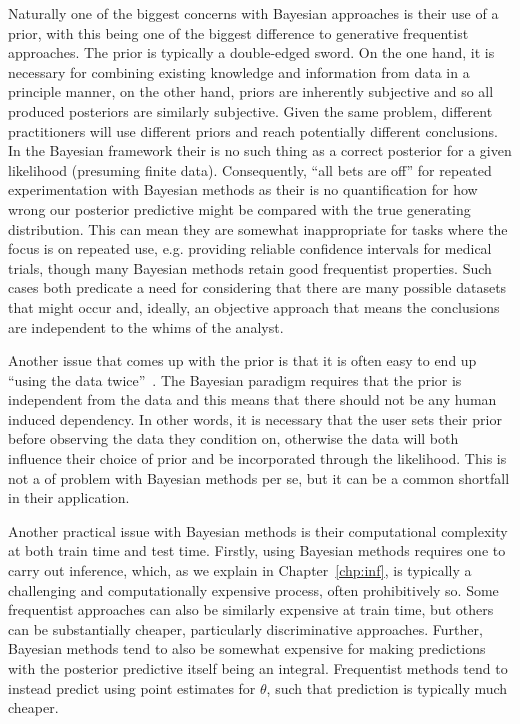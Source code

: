 Naturally one of the biggest concerns with Bayesian approaches is their use of a prior, with this being
one of the biggest difference to generative frequentist approaches.  The prior is typically a double-edged
sword.  On the one hand, it is necessary for combining existing knowledge and information from data 
in a principle manner, on the other hand, priors are inherently subjective and so all produced posteriors are
similarly subjective.  Given the same problem, different practitioners will use different priors and reach
potentially different conclusions.  In the Bayesian framework their is no such thing
as a correct posterior for a given likelihood (presuming finite data).
Consequently, ``all bets are off'' for repeated experimentation with Bayesian methods as their is no
quantification for how wrong our posterior predictive might be compared with the true generating
distribution.  This can mean they  are somewhat inappropriate for tasks where the focus is on repeated use,
e.g. providing reliable confidence intervals for medical trials, though many Bayesian methods retain
good frequentist properties.  Such cases both predicate a need for
considering that there are many possible datasets that might occur and, ideally, an objective approach
that means the conclusions are independent to the whims of the analyst.

Another issue that comes up with the prior is that it is often easy to end up 
``using the data twice''~\citep{gelman2008objections}.  The Bayesian paradigm requires that the
prior is independent from the data and this means that there should not be any human induced
dependency.  In other words, it is necessary that the user sets their prior before
observing the data they condition on, otherwise the data will both influence their choice of prior
and be incorporated through the likelihood.  This is not a of problem with Bayesian 
methods per se, but it can be a common shortfall in their application.

Another practical issue with Bayesian methods is their computational complexity at both
train time and test time.  Firstly, using Bayesian methods requires one to carry out inference,
which, as we explain in Chapter~\ref{chp:inf}, is typically a challenging and computationally
expensive process, often prohibitively so.  Some frequentist approaches can also
be similarly expensive at train time, but others can be substantially cheaper, particularly
discriminative approaches.  Further, Bayesian methods tend to also be somewhat expensive
for making predictions with the posterior predictive itself being an integral.  Frequentist
methods tend to instead predict using point estimates for $\theta$, such that prediction is typically
much cheaper.

